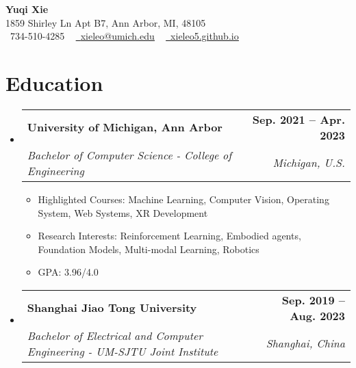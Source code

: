 \documentclass[letterpaper,11pt]{article}
\makeatletter
\newcommand{\resumeSubheading}[5]{
  \vspace{-2pt}\item
    \begin{tabular*}{1.0\textwidth}[t]{l@{\extracolsep{\fill}}r}
      \textbf{#1} \textit{#2} & \textbf{\small #3} \\
      \textit{\small#4} & \textit{\small #5} \\
    \end{tabular*}\vspace{-7pt}
}
\newcommand{\resumeSubHeadingListStart}{\begin{itemize}[leftmargin=0.0in, label={}]}
\newcommand{\resumeSubHeadingListEnd}{\end{itemize}}
\makeatother
\begin{document}

\begin{center}
    {\Large \textbf{Yuqi Xie} } \\ \vspace{1pt}
    1859 Shirley Ln Apt B7, Ann Arbor, MI, 48105 \\ \vspace{1pt}
    \small \raisebox{-0.1\height}\faPhone\ 734-510-4285 ~ \href{mailto:xieleo@umich.edu}{\raisebox{-0.2\height}\faEnvelope\  \underline{xieleo@umich.edu}} ~ 
    \href{https://xieleo5.github.io}{\raisebox{-0.2\height}\faGithub\ \underline{xieleo5.github.io}}
    \vspace{-8pt}
\end{center}


\section{Education}
  \resumeSubHeadingListStart
    \resumeSubheading
      {University of Michigan, Ann Arbor}{}{Sep. 2021 -- Apr. 2023}
      {Bachelor of Computer Science - College of Engineering}{Michigan, U.S.}
    \begin{itemize}
      \item \small Highlighted Courses: Machine Learning, Computer Vision, Operating System, Web Systems, XR Development
      \item \small Research Interests: Reinforcement Learning, Embodied agents, Foundation Models, Multi-modal Learning, Robotics
      \item \small GPA: 3.96/4.0
    \end{itemize}
    \vspace*{5.0\multicolsep}
  \resumeSubHeadingListEnd
  \resumeSubHeadingListStart
    \resumeSubheading
      {Shanghai Jiao Tong University}{}{Sep. 2019 -- Aug. 2023}
      {Bachelor of Electrical and Computer Engineering - UM-SJTU Joint Institute}{Shanghai, China}
  \resumeSubHeadingListEnd
\end{document}
